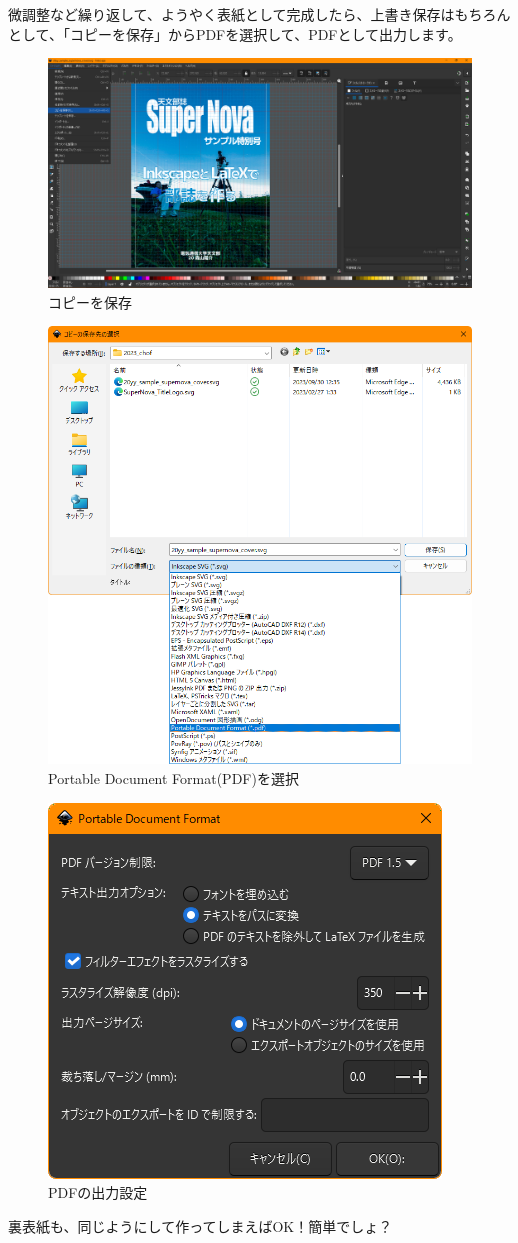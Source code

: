 \documentclass[../main]{subfiles}
\begin{document}
微調整など繰り返して、ようやく表紙として完成したら、上書き保存はもちろんとして、「コピーを保存」からPDFを選択して、PDFとして出力します。
\begin{figure}[H]
  \centering
  \includegraphics[width=.5\textwidth]{figures/ss270.png}
  \caption{コピーを保存}
  \label{fig:ss270}
\end{figure}
\begin{figure}[H]
  \centering
  \includegraphics[width=.5\textwidth]{figures/ss272.png}
  \caption{Portable Document Format(PDF)を選択}
  \label{fig:ss272}
\end{figure}
\begin{figure}[H]
  \centering
  \includegraphics[width=.5\textwidth]{figures/ss273.png}
  \caption{PDFの出力設定}
  \label{fig:ss273}
\end{figure}
裏表紙も、同じようにして作ってしまえばOK！簡単でしょ？
\end{document}
